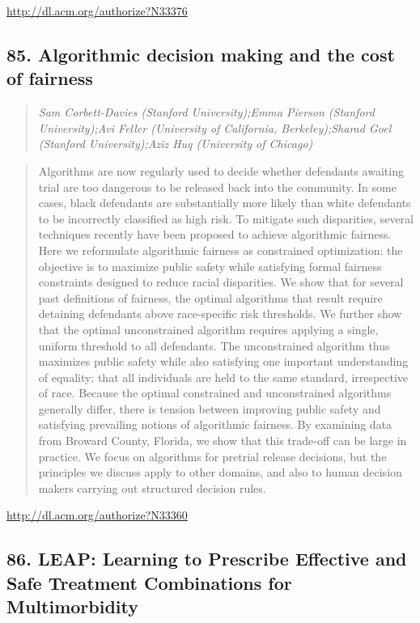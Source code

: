 \documentclass{article}
\begin{document}
\href{http://dl.acm.org/authorize?N33376}{http://dl.acm.org/authorize?N33376}

\subsection{85. Algorithmic decision making and the cost of fairness}

\begin{quote}
\footnotesize{\textit{Sam Corbett-Davies (Stanford University);Emma Pierson (Stanford University);Avi Feller (University of California, Berkeley);Sharad Goel (Stanford University);Aziz Huq (University of Chicago)}}

\end{quote}

\begin{quote}
Algorithms are now regularly used to decide whether defendants awaiting trial are too dangerous to be released back into the community. In some cases, black defendants are substantially more likely than white defendants to be incorrectly classified as high risk. To mitigate such disparities, several techniques recently have been proposed to achieve algorithmic fairness. Here we reformulate algorithmic fairness as constrained optimization: the objective is to maximize public safety while satisfying formal fairness constraints designed to reduce racial disparities. We show that for several past definitions of fairness, the optimal algorithms that result require detaining defendants above race-specific risk thresholds. We further show that the optimal unconstrained algorithm requires applying a single, uniform threshold to all defendants. The unconstrained algorithm thus maximizes public safety while also satisfying one important understanding of equality: that all individuals are held to the same standard, irrespective of race. Because the optimal constrained and unconstrained algorithms generally differ, there is tension between improving public safety and satisfying prevailing notions of algorithmic fairness. By examining data from Broward County, Florida, we show that this trade-off can be large in practice. We focus on algorithms for pretrial release decisions, but the principles we discuss apply to other domains, and also to human decision makers carrying out structured decision rules.
\end{quote}

\href{http://dl.acm.org/authorize?N33360}{http://dl.acm.org/authorize?N33360}

\subsection{86. LEAP: Learning to Prescribe Effective and Safe Treatment Combinations for Multimorbidity}
\end{document}
